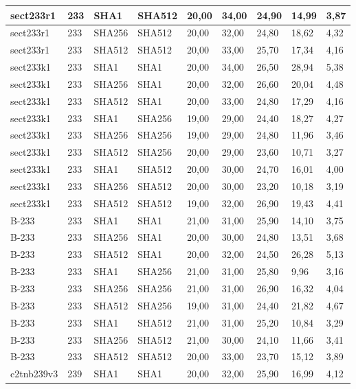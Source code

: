 \begin{longtable}{| l | l | l | l | l |l |l |l |l |}
sect233r1 & 233 & SHA1 & SHA512 & 20,00 & 34,00 & 24,90 & 14,99 & 3,87 \\ \hline 
sect233r1 & 233 & SHA256 & SHA512 & 20,00 & 32,00 & 24,80 & 18,62 & 4,32 \\ \hline 
sect233r1 & 233 & SHA512 & SHA512 & 20,00 & 33,00 & 25,70 & 17,34 & 4,16 \\ \hline 
sect233k1 & 233 & SHA1 & SHA1 & 20,00 & 34,00 & 26,50 & 28,94 & 5,38 \\ \hline 
sect233k1 & 233 & SHA256 & SHA1 & 20,00 & 32,00 & 26,60 & 20,04 & 4,48 \\ \hline 
sect233k1 & 233 & SHA512 & SHA1 & 20,00 & 33,00 & 24,80 & 17,29 & 4,16 \\ \hline 
sect233k1 & 233 & SHA1 & SHA256 & 19,00 & 29,00 & 24,40 & 18,27 & 4,27 \\ \hline 
sect233k1 & 233 & SHA256 & SHA256 & 19,00 & 29,00 & 24,80 & 11,96 & 3,46 \\ \hline 
sect233k1 & 233 & SHA512 & SHA256 & 20,00 & 29,00 & 23,60 & 10,71 & 3,27 \\ \hline 
sect233k1 & 233 & SHA1 & SHA512 & 20,00 & 30,00 & 24,70 & 16,01 & 4,00 \\ \hline 
sect233k1 & 233 & SHA256 & SHA512 & 20,00 & 30,00 & 23,20 & 10,18 & 3,19 \\ \hline 
sect233k1 & 233 & SHA512 & SHA512 & 19,00 & 32,00 & 26,90 & 19,43 & 4,41 \\ \hline 
B-233 & 233 & SHA1 & SHA1 & 21,00 & 31,00 & 25,90 & 14,10 & 3,75 \\ \hline 
B-233 & 233 & SHA256 & SHA1 & 20,00 & 30,00 & 24,80 & 13,51 & 3,68 \\ \hline 
B-233 & 233 & SHA512 & SHA1 & 20,00 & 32,00 & 24,50 & 26,28 & 5,13 \\ \hline 
B-233 & 233 & SHA1 & SHA256 & 21,00 & 31,00 & 25,80 & 9,96 & 3,16 \\ \hline 
B-233 & 233 & SHA256 & SHA256 & 21,00 & 31,00 & 26,90 & 16,32 & 4,04 \\ \hline 
B-233 & 233 & SHA512 & SHA256 & 19,00 & 31,00 & 24,40 & 21,82 & 4,67 \\ \hline 
B-233 & 233 & SHA1 & SHA512 & 21,00 & 31,00 & 25,20 & 10,84 & 3,29 \\ \hline 
B-233 & 233 & SHA256 & SHA512 & 21,00 & 30,00 & 24,10 & 11,66 & 3,41 \\ \hline 
B-233 & 233 & SHA512 & SHA512 & 20,00 & 33,00 & 23,70 & 15,12 & 3,89 \\ \hline 
c2tnb239v3 & 239 & SHA1 & SHA1 & 20,00 & 32,00 & 25,90 & 16,99 & 4,12 \\ \hline 

\end{longtable}
